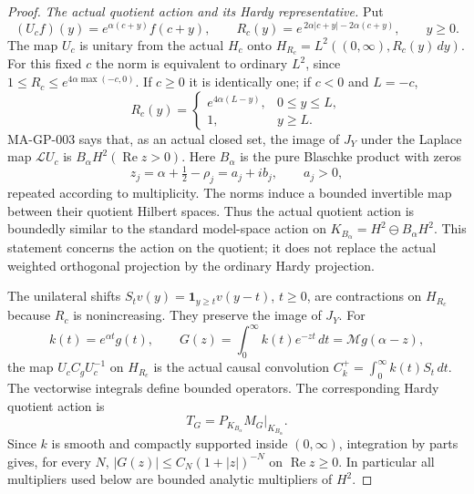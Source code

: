 \begin{proof}
\emph{The actual quotient action and its Hardy representative.}
Put
\[
 (U_cf)(y)=e^{\alpha(c+y)}f(c+y),\qquad
 R_c(y)=e^{\,2\alpha|c+y|-2\alpha(c+y)},\qquad y\ge0.
 \tag{MA-GP.84}
\]
The map $U_c$ is unitary from the actual $H_c$ onto
$H_{R_c}=L^2((0,\infty),R_c(y)\,dy)$.
For this fixed $c$ the norm is equivalent to ordinary $L^2$,
since $1\le R_c\le e^{4\alpha\max(-c,0)}$.
If $c\ge0$ it is identically one; if $c<0$ and $L=-c$,
\[
 R_c(y)=
 \begin{cases}
       e^{4\alpha(L-y)},&0\le y\le L,\\
       1,&y\ge L.
 \end{cases}
 \tag{MA-GP.85}
\]
MA-GP-003 says that, as an actual closed set,
the image of $J_Y$ under the Laplace map $\mathcal L U_c$
is $B_\alpha H^2(\operatorname{Re}z>0)$.
Here $B_\alpha$ is the pure Blaschke product with zeros
\[
                 z_j=\alpha+\tfrac12-\rho_j=a_j+ib_j,
          \qquad a_j>0,
 \tag{MA-GP.86}
\]
repeated according to multiplicity.
The norms induce a bounded invertible map between their
quotient Hilbert spaces.  Thus the actual quotient action is
boundedly similar to the standard model-space action on
$K_{B_\alpha}=H^2\ominus B_\alpha H^2$.
This statement concerns the action on the quotient; it does
not replace the actual weighted orthogonal projection by the
ordinary Hardy projection.

The unilateral shifts $S_t v(y)=\mathbf1_{y\ge t}v(y-t)$,
$t\ge0$, are contractions on $H_{R_c}$ because $R_c$ is
nonincreasing.  They preserve the image of $J_Y$.
For
\[
      k(t)=e^{\alpha t}g(t),\qquad
      G(z)=\int_0^\infty k(t)e^{-zt}\,dt
                           =\mathcal Mg(\alpha-z),
 \tag{MA-GP.87}
\]
the map $U_c C_g U_c^{-1}$ on $H_{R_c}$ is the actual
causal convolution $C_k^+=\int_0^\infty k(t)S_t\,dt$.
The vectorwise integrals define bounded operators.
The corresponding Hardy quotient action is
\[
                 T_G=P_{K_{B_\alpha}}M_G|_{K_{B_\alpha}}.
 \tag{MA-GP.88}
\]
Since $k$ is smooth and compactly supported inside $(0,\infty)$,
integration by parts gives, for every $N$,
$|G(z)|\le C_N(1+|z|)^{-N}$ on $\operatorname{Re}z\ge0$.
In particular all multipliers used below are bounded analytic
multipliers of $H^2$.


\end{proof}
